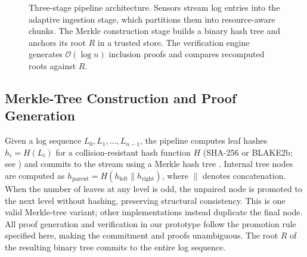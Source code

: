 \documentclass[preprint,12pt]{elsarticle}
\begin{document}
\begin{figure}[t]
{
}%
\caption{Three-stage pipeline architecture.
Sensors stream log entries into the adaptive ingestion stage, which partitions them into resource-aware chunks.
The Merkle construction stage builds a binary hash tree and anchors its root $R$ in a trusted store.
The verification engine generates $\mathcal{O}(\log n)$ inclusion proofs and compares recomputed roots against $R$.}
\label{fig:architecture}
\end{figure}

\subsection{Merkle-Tree Construction and Proof Generation}
\label{sec:merkle}

Given a log sequence $L_0, L_1, \ldots, L_{n-1}$, the pipeline computes leaf hashes $h_i = H(L_i)$ for a collision-resistant hash function $H$ (SHA-256 or BLAKE2b; see ) and commits to the stream using a Merkle hash tree \citep{merkle1987digital}.
Internal tree nodes are computed as $h_{\text{parent}} = H(h_{\text{left}} \| h_{\text{right}})$, where $\|$ denotes concatenation.
When the number of leaves at any level is odd, the unpaired node is promoted to the next level without hashing, preserving structural consistency.
This is one valid Merkle-tree variant; other implementations instead duplicate the final node.
All proof generation and verification in our prototype follow the promotion rule specified here, making the commitment and proofs unambiguous.
The root $R$ of the resulting binary tree commits to the entire log sequence.
\end{document}
